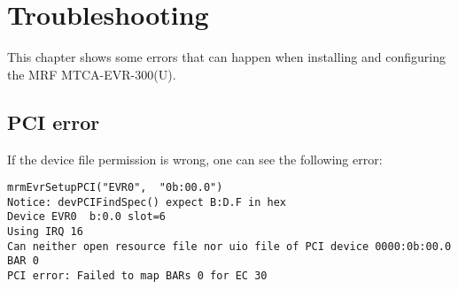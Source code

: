 \documentclass[11pt
  , a4paper
  , article
  , oneside
  , showtrims
]{memoir}
\begin{document}
{%
\chapter{Troubleshooting}
This chapter shows some errors that can happen when installing and configuring the MRF MTCA-EVR-300(U).


\section{PCI error}
If the device file permission is wrong, one can see the following error:
\begin{lstlisting}
mrmEvrSetupPCI("EVR0",  "0b:00.0")
Notice: devPCIFindSpec() expect B:D.F in hex
Device EVR0  b:0.0 slot=6
Using IRQ 16
Can neither open resource file nor uio file of PCI device 0000:0b:00.0 BAR 0
PCI error: Failed to map BARs 0 for EC 30
\end{lstlisting}


\clearpage



}
\end{document}
